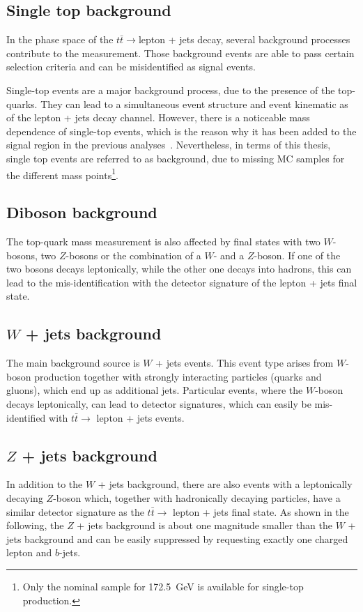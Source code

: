  
 \subsection{Single top background}
 
 In the phase space of the $t\bar{t} \rightarrow$lepton + jets decay, several background processes contribute to the measurement.  Those background events are able to pass certain selection criteria and can be misidentified as signal events.
 
 Single-top events are a major background process, due to the presence of the top-quarks. They can lead to a simultaneous event structure and  event kinematic as of the lepton + jets  decay channel. However, there is a noticeable mass dependence of single-top events, which is the reason why it has been added to the signal region in the previous analyses~\cite{ATLAS-CONF-2017-071, Aad:2015nba}. Nevertheless, in terms of this thesis, single top events are referred to as background, due to missing MC samples for the different mass points\footnote{Only the nominal sample for 172.5~GeV is available for single-top production.}. 
 
 \subsection{Diboson background}
 The top-quark mass measurement is also affected by final states with two $W$-bosons, two $Z$-bosons or the combination of a $W$- and a $Z$-boson.  If one of the two bosons decays leptonically, while the other one decays into hadrons, this can lead to the mis-identification with the detector signature of the lepton + jets final state.  
 

 \subsection{$W$ + jets background}
The main background source  is $W$ + jets events. This event type arises from $W$-boson production together with strongly interacting particles (quarks and gluons), which end up as additional jets. Particular events, where the $W$-boson decays leptonically, can lead to detector signatures, which can easily be mis-identified with $t\bar{t} \rightarrow$ lepton + jets events.



 \subsection{$Z$ + jets background} 
In addition to the $W$ + jets background, there are also events with a leptonically decaying $Z$-boson which, together with hadronically decaying particles, have a similar detector signature as the  $t\bar{t} \rightarrow$ lepton + jets final state. As shown in the following, the $Z$ + jets background is about one magnitude smaller than the $W$ + jets background and can be easily suppressed by requesting exactly one charged lepton and $b$-jets.



